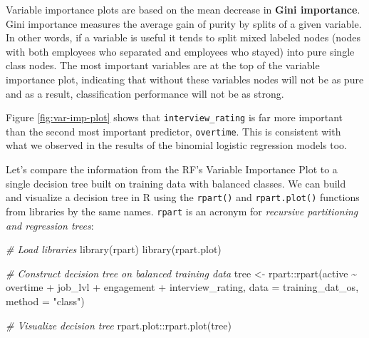 \documentclass[
]{book}
\newenvironment{Shaded}{\begin{snugshade}}{\end{snugshade}}
\newcommand{\AttributeTok}[1]{\textcolor[rgb]{0.77,0.63,0.00}{#1}}
\newcommand{\CommentTok}[1]{\textcolor[rgb]{0.56,0.35,0.01}{\textit{#1}}}
\newcommand{\FunctionTok}[1]{\textcolor[rgb]{0.00,0.00,0.00}{#1}}
\newcommand{\NormalTok}[1]{#1}
\newcommand{\OtherTok}[1]{\textcolor[rgb]{0.56,0.35,0.01}{#1}}
\newcommand{\SpecialCharTok}[1]{\textcolor[rgb]{0.00,0.00,0.00}{#1}}
\newcommand{\StringTok}[1]{\textcolor[rgb]{0.31,0.60,0.02}{#1}}
\begin{document}
Variable importance plots are based on the mean decrease in \textbf{Gini importance}. Gini importance measures the average gain of purity by splits of a given variable. In other words, if a variable is useful it tends to split mixed labeled nodes (nodes with both employees who separated and employees who stayed) into pure single class nodes. The most important variables are at the top of the variable importance plot, indicating that without these variables nodes will not be as pure and as a result, classification performance will not be as strong.

Figure \ref{fig:var-imp-plot} shows that \texttt{interview\_rating} is far more important than the second most important predictor, \texttt{overtime}. This is consistent with what we observed in the results of the binomial logistic regression models too.

Let's compare the information from the RF's Variable Importance Plot to a single decision tree built on training data with balanced classes. We can build and visualize a decision tree in R using the \texttt{rpart()} and \texttt{rpart.plot()} functions from libraries by the same names. \texttt{rpart} is an acronym for \emph{recursive partitioning and regression trees}:

\begin{Shaded}
\begin{Highlighting}[]
\CommentTok{\# Load libraries}
\FunctionTok{library}\NormalTok{(rpart)}
\FunctionTok{library}\NormalTok{(rpart.plot)}

\CommentTok{\# Construct decision tree on balanced training data}
\NormalTok{tree }\OtherTok{\textless{}{-}}\NormalTok{ rpart}\SpecialCharTok{::}\FunctionTok{rpart}\NormalTok{(active }\SpecialCharTok{\textasciitilde{}}\NormalTok{ overtime }\SpecialCharTok{+}\NormalTok{ job\_lvl }\SpecialCharTok{+}\NormalTok{  engagement }\SpecialCharTok{+}\NormalTok{ interview\_rating, }\AttributeTok{data =}\NormalTok{ training\_dat\_os, }\AttributeTok{method =} \StringTok{"class"}\NormalTok{)}

\CommentTok{\# Visualize decision tree}
\NormalTok{rpart.plot}\SpecialCharTok{::}\FunctionTok{rpart.plot}\NormalTok{(tree)}
\end{Highlighting}
\end{Shaded}
\end{document}
